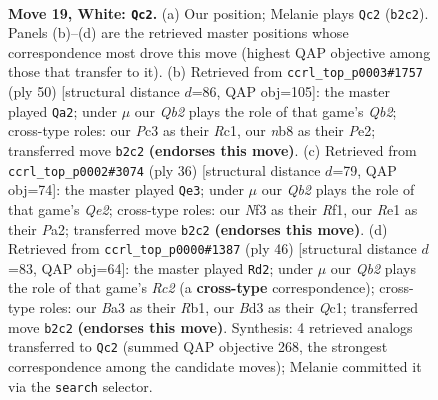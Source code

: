 \documentclass[11pt]{article}
\begin{document}
\clearpage

\begin{figure}[p]\centering
\begin{subfigure}{0.46\textwidth}\centering
\resizebox{\linewidth}{!}{%
\newchessgame
\chessboard[
  setfen={rnbqr2k/5p2/1p2pnp1/7p/p2P4/B1PB1NPP/PQ3P2/R3R1K1 w - - 1 19},
  showmover=false,
  pgfstyle=straightmove, color=movearrow, markmove={b2-c2}
]}
\caption{}
\end{subfigure}\hfill
\begin{subfigure}{0.46\textwidth}\centering
\resizebox{\linewidth}{!}{%
\newchessgame
\chessboard[
  setfen={2r1r1k1/2qnbpp1/1p1pp2p/pP6/P1P5/4B1P1/1Q2PPNP/2RR2K1 w - - 1 26},
  showmover=false,
  pgfstyle=straightmove, color=movearrow, markmove={b2-a2}
]}
\caption{}
\end{subfigure}
\\[4pt]
\begin{subfigure}{0.46\textwidth}\centering
\resizebox{\linewidth}{!}{%
\newchessgame
\chessboard[
  setfen={2k1n1rr/pp2qb1p/2p1pp2/2Pp4/7N/2PB3P/PP2QPP1/R4RK1 w - - 1 19},
  showmover=false,
  pgfstyle=straightmove, color=movearrow, markmove={e2-e3}
]}
\caption{}
\end{subfigure}\hfill
\begin{subfigure}{0.46\textwidth}\centering
\resizebox{\linewidth}{!}{%
\newchessgame
\chessboard[
  setfen={r3r1k1/1b2qpp1/7p/1Pnp4/2pN4/p3P3/P1R1BPPP/1RQ3K1 w - - 2 24},
  showmover=false,
  pgfstyle=straightmove, color=movearrow, markmove={c2-d2}
]}
\caption{}
\end{subfigure}
\caption{\textbf{Move 19, White: \texttt{Qc2}.} (a) Our position; Melanie plays \texttt{Qc2} (\texttt{b2c2}). Panels (b)--(d) are the retrieved master positions whose correspondence most drove this move (highest QAP objective among those that transfer to it). (b) Retrieved from \texttt{ccrl\_top\_p0003\#1757} (ply 50) [structural distance $d$=86, QAP obj=105]: the master played \texttt{Qa2}; under $\mu$ our \emph{Qb2} plays the role of that game's \emph{Qb2}; cross-type roles: our \emph{P}c3 as their \emph{R}c1, our \emph{n}b8 as their \emph{P}e2; transferred move \texttt{b2c2} \textbf{(endorses this move)}. (c) Retrieved from \texttt{ccrl\_top\_p0002\#3074} (ply 36) [structural distance $d$=79, QAP obj=74]: the master played \texttt{Qe3}; under $\mu$ our \emph{Qb2} plays the role of that game's \emph{Qe2}; cross-type roles: our \emph{N}f3 as their \emph{R}f1, our \emph{R}e1 as their \emph{P}a2; transferred move \texttt{b2c2} \textbf{(endorses this move)}. (d) Retrieved from \texttt{ccrl\_top\_p0000\#1387} (ply 46) [structural distance $d$=83, QAP obj=64]: the master played \texttt{Rd2}; under $\mu$ our \emph{Qb2} plays the role of that game's \emph{Rc2} (a \textbf{cross-type} correspondence); cross-type roles: our \emph{B}a3 as their \emph{R}b1, our \emph{B}d3 as their \emph{Q}c1; transferred move \texttt{b2c2} \textbf{(endorses this move)}. Synthesis: 4 retrieved analogs transferred to \texttt{Qc2} (summed QAP objective 268, the strongest correspondence among the candidate moves); Melanie committed it via the \texttt{search} selector.}
\label{fig:thought-m36}
\end{figure}
\end{document}
